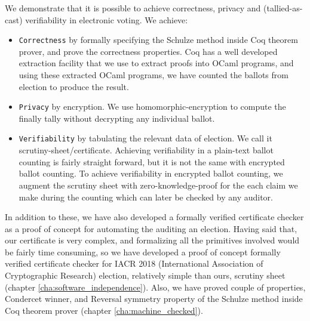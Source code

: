 We demonstrate that it is possible to achieve correctness, privacy and (tallied-as-cast) verifiability in 
electronic voting. We achieve:
\begin{itemize}
 \item \texttt{Correctness} by formally specifying the Schulze method  inside 
 Coq theorem prover, and prove the correctness properties. 
 Coq has a well developed extraction facility that 
 we use to extract proofs into OCaml programs, and using these extracted OCaml programs, we 
 have counted the ballots from election to produce the result. 
 \item \texttt{Privacy} by encryption. We use homomorphic-encryption to compute the 
  finally tally without decrypting any individual ballot. 
\item \texttt{Verifiability} by tabulating the relevant data of election. We call it scrutiny-sheet/certificate. 
   Achieving verifiability in a plain-text ballot counting is fairly straight forward, but it is not 
   the same with encrypted ballot counting.  To achieve verifiability in encrypted ballot counting, 
   we augment the scrutiny sheet with zero-knowledge-proof for the each claim we make during the 
   counting which can  later be checked by any auditor.  
\end{itemize}




 In addition to these, we have also developed a formally verified certificate checker 
 as a proof of concept for automating the auditing an election.  Having said that, 
 our certificate is very complex, and formalizing all the primitives involved would be 
 fairly time consuming, so we have developed a proof of concept 
formally verified certificate checker for IACR 2018 (International Association of Cryptographic Research) election, 
relatively simple than ours, scrutiny sheet (chapter \ref{cha:software_independence}). 
Also, we have proved couple of properties, Condercet winner, and Reversal symmetry property 
of the Schulze method inside Coq theorem prover (chapter \ref{cha:machine_checked}). 
 

